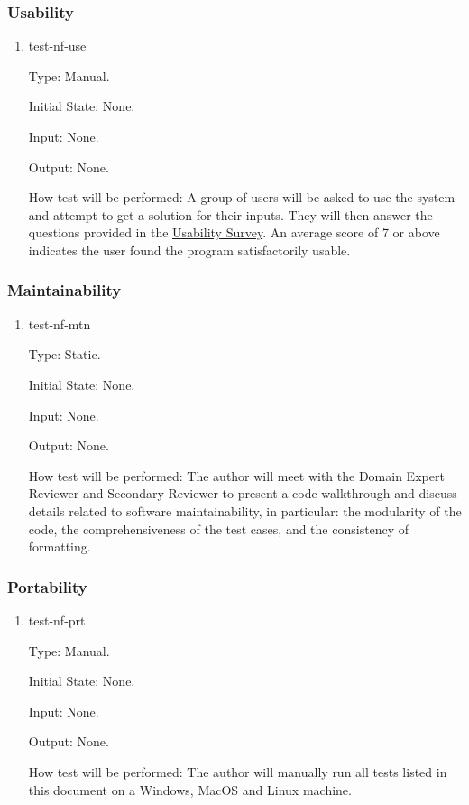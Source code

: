 \documentclass[12pt, titlepage]{article}
\begin{document}
\subsubsection{Usability}
\begin{enumerate}

\item{test-nf-use\\}

Type: Manual.
					
Initial State: None.
					
Input: None.
					
Output: None.
					
How test will be performed: A group of users will be asked to use the system and attempt to get a solution for their inputs. They will then answer the questions provided in the \hyperref[use_survey]{Usability Survey}. An average score of 7 or above indicates the user found the program satisfactorily usable.

\end{enumerate}

\subsubsection{Maintainability}
\begin{enumerate}

\item{test-nf-mtn\\}

Type: Static.
					
Initial State: None.
					
Input: None.
					
Output: None.
					
How test will be performed: The author will meet with the Domain Expert Reviewer and Secondary Reviewer to present a code walkthrough and discuss details related to software maintainability, in particular: the modularity of the code, the comprehensiveness of the test cases, and the consistency of formatting. 
\end{enumerate}

\subsubsection{Portability}
\begin{enumerate}

\item{test-nf-prt\\}

Type: Manual.
					
Initial State: None.
					
Input: None.
					
Output: None.
					
How test will be performed: The author will manually run all tests listed in this document on a Windows, MacOS and Linux machine. 
\end{enumerate}
\end{document}

